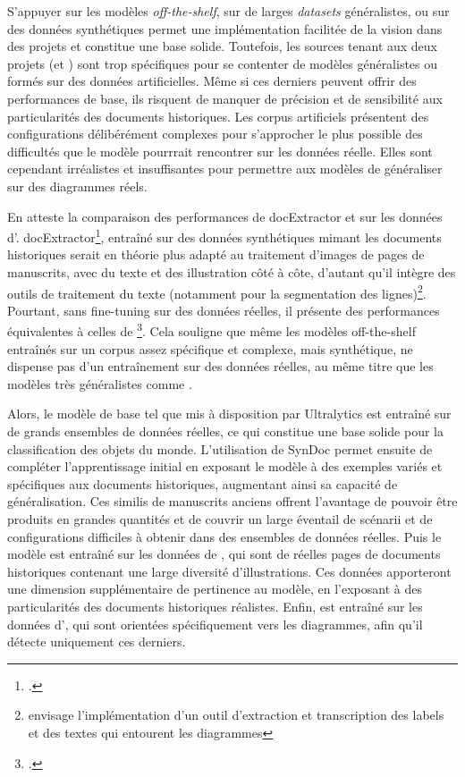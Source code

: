 S'appuyer sur les modèles \textit{off-the-shelf}, sur de larges \textit{datasets}
généralistes, ou sur des données synthétiques permet une implémentation
facilitée de la vision dans des projets et constitue une base solide.
Toutefois, les sources tenant aux deux projets (\vhs et \eida) sont trop
spécifiques pour se contenter de modèles généralistes ou formés sur des
données artificielles. Même si ces derniers peuvent offrir des performances
de base, ils risquent de manquer de précision et de sensibilité aux
particularités des documents historiques. Les corpus artificiels
présentent des configurations délibérément complexes pour s'approcher le
plus possible des difficultés que le modèle pourrrait rencontrer sur les
données réelle. Elles sont cependant irréalistes et insuffisantes pour
permettre aux modèles de généraliser sur des diagrammes réels.

En atteste la comparaison des performances de docExtractor et \yolov sur
les données d'\eida. docExtractor\footcite{monnier_docextractor_2020}, entraîné
sur des données synthétiques mimant les documents historiques serait en
théorie plus adapté au traitement d'images de pages de manuscrits, avec
du texte et des illustration côté à côte, d'autant qu'il intègre des
outils de traitement du texte (notamment pour la segmentation des
lignes)\footnote{\eida envisage l'implémentation d'un outil d'extraction
  et transcription des labels et des textes qui entourent les diagrammes}.
Pourtant, sans fine-tuning sur des données réelles, il présente des
performances équivalentes à celles de \yolov\footcite[p.45]{norindr_traitement_2023}. Cela
souligne que même les modèles off-the-shelf entraînés sur un corpus
assez spécifique et complexe, mais synthétique, ne dispense pas d'un
entraînement sur des données réelles, au même titre que les modèles très
généralistes comme \yolov.

Alors, le modèle de base \yolov tel que mis à disposition par
Ultralytics est entraîné sur de grands ensembles de données réelles, ce
qui constitue une base solide pour la classification des objets du
monde. L'utilisation de SynDoc permet ensuite de compléter
l'apprentissage initial en exposant le modèle à des exemples variés et
spécifiques aux documents historiques, augmentant ainsi sa capacité de
généralisation. Ces similis de manuscrits anciens offrent l'avantage de
pouvoir être produits en grandes quantités et de couvrir un large
éventail de scénarii et de configurations difficiles à obtenir dans des
ensembles de données réelles. Puis le modèle est entraîné sur les
données de \vhs, qui sont de réelles pages de documents historiques
contenant une large diversité d'illustrations. Ces données apporteront
une dimension supplémentaire de pertinence au modèle, en l'exposant à
des particularités des documents historiques réalistes. Enfin, \yolov
est entraîné sur les données d'\eida, qui sont orientées spécifiquement
vers les diagrammes, afin qu'il détecte uniquement ces derniers.

